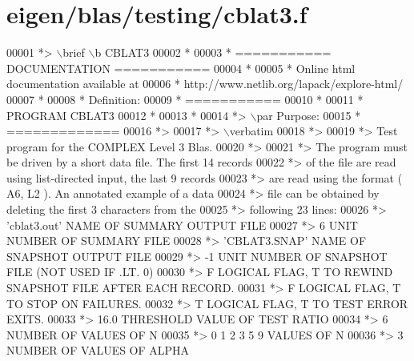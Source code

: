 \hypertarget{eigen_2blas_2testing_2cblat3_8f_source}{}\section{eigen/blas/testing/cblat3.f}
\label{eigen_2blas_2testing_2cblat3_8f_source}

\begin{DoxyCode}
00001 \textcolor{comment}{*> \(\backslash\)brief \(\backslash\)b CBLAT3}
00002 \textcolor{comment}{*}
00003 \textcolor{comment}{*  =========== DOCUMENTATION ===========}
00004 \textcolor{comment}{*}
00005 \textcolor{comment}{* Online html documentation available at }
00006 \textcolor{comment}{*            http://www.netlib.org/lapack/explore-html/ }
00007 \textcolor{comment}{*}
00008 \textcolor{comment}{*  Definition:}
00009 \textcolor{comment}{*  ===========}
00010 \textcolor{comment}{*}
00011 \textcolor{comment}{*       PROGRAM CBLAT3}
00012 \textcolor{comment}{* }
00013 \textcolor{comment}{*}
00014 \textcolor{comment}{*> \(\backslash\)par Purpose:}
00015 \textcolor{comment}{*  =============}
00016 \textcolor{comment}{*>}
00017 \textcolor{comment}{*> \(\backslash\)verbatim}
00018 \textcolor{comment}{*>}
00019 \textcolor{comment}{*> Test program for the COMPLEX          Level 3 Blas.}
00020 \textcolor{comment}{*>}
00021 \textcolor{comment}{*> The program must be driven by a short data file. The first 14 records}
00022 \textcolor{comment}{*> of the file are read using list-directed input, the last 9 records}
00023 \textcolor{comment}{*> are read using the format ( A6, L2 ). An annotated example of a data}
00024 \textcolor{comment}{*> file can be obtained by deleting the first 3 characters from the}
00025 \textcolor{comment}{*> following 23 lines:}
00026 \textcolor{comment}{*> 'cblat3.out'      NAME OF SUMMARY OUTPUT FILE}
00027 \textcolor{comment}{*> 6                 UNIT NUMBER OF SUMMARY FILE}
00028 \textcolor{comment}{*> 'CBLAT3.SNAP'     NAME OF SNAPSHOT OUTPUT FILE}
00029 \textcolor{comment}{*> -1                UNIT NUMBER OF SNAPSHOT FILE (NOT USED IF .LT. 0)}
00030 \textcolor{comment}{*> F        LOGICAL FLAG, T TO REWIND SNAPSHOT FILE AFTER EACH RECORD.}
00031 \textcolor{comment}{*> F        LOGICAL FLAG, T TO STOP ON FAILURES.}
00032 \textcolor{comment}{*> T        LOGICAL FLAG, T TO TEST ERROR EXITS.}
00033 \textcolor{comment}{*> 16.0     THRESHOLD VALUE OF TEST RATIO}
00034 \textcolor{comment}{*> 6                 NUMBER OF VALUES OF N}
00035 \textcolor{comment}{*> 0 1 2 3 5 9       VALUES OF N}
00036 \textcolor{comment}{*> 3                 NUMBER OF VALUES OF ALPHA}

\end{DoxyCode}

